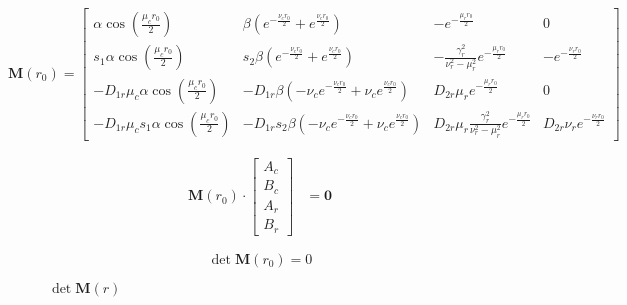 \begin{equation}
    \pmb{M}(r_0) = 
    \begin{bmatrix}
        \alpha\cos(\frac{\mu_c r_0}{2}) & \beta(e^{-\frac{\nu_c r_0}{2}}+e^{\frac{\nu_c r_0}{2}}) & -e^{-\frac{\mu_r r_0}{2}} & 0 \\
        s_1\alpha\cos(\frac{\mu_c r_0}{2}) & s_2\beta(e^{-\frac{\nu_c r_0}{2}}+e^{\frac{\nu_c r_0}{2}}) & -\frac{\gamma_r^2}{\nu_r^2 - \mu_r^2}e^{-\frac{\mu_r r_0}{2}} & -e^{-\frac{\nu_r r_0}{2}} \\
        -D_{1r}\mu_c\alpha\cos(\frac{\mu_c r_0}{2}) & -D_{1r}\beta(-\nu_c e^{-\frac{\nu_c r_0}{2}}+\nu_c e^{\frac{\nu_c r_0}{2}}) & D_{2r}\mu_r e^{-\frac{\mu_r r_0}{2}} & 0 \\
        -D_{1r}\mu_c s_1\alpha\cos(\frac{\mu_c r_0}{2}) & -D_{1r}s_2\beta(-\nu_c e^{-\frac{\nu_c r_0}{2}}+\nu_c e^{\frac{\nu_c r_0}{2}}) & D_{2r}\mu_r\frac{\gamma_r^2}{\nu_r^2 - \mu_r^2}e^{-\frac{\mu_r r_0}{2}} & D_{2r}\nu_r e^{-\frac{\nu_r r_0}{2}}
    \end{bmatrix}
\end{equation}

\begin{align}
    \pmb{M}(r_0) \cdot \begin{bmatrix}
        A_c \\
        B_c \\
        A_r \\
        B_r
    \end{bmatrix} &= \pmb{0}
\end{align}

\begin{equation}
    \det \pmb{M}(r_0) = 0
\end{equation}

\begin{figure}[H]
    \centering
    
    \caption{$\det \pmb{M}(r)$}
    \label{fig:det_M}
\end{figure}
